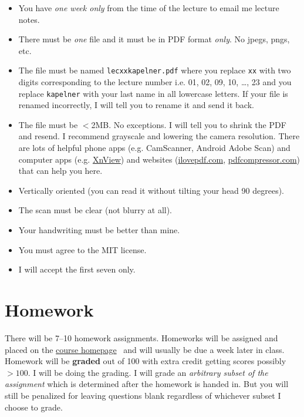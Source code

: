 \documentclass[12pt]{article}
\newcommand{\coursewebpage}{\href{https://github.com/kapelner/QC_Math_621_Fall_2020}{course homepage}}
\newcommand{\pdfcompressiontext}{I recommend  grayscale and lowering the camera resolution. There are lots of helpful phone apps (e.g. CamScanner, Android Adobe Scan) and computer apps (e.g. \href{http://www.xnconvert.com/downloads}{XnView})  and websites (\url{ilovepdf.com}, \url{pdfcompressor.com}) that can help you here.}
\begin{document}
\begin{itemize}
\item You have \emph{one week only} from the time of the lecture to email me lecture notes.
\item There must be \emph{one} file and it must be in PDF format \textit{only}. No jpegs, pngs, etc.
\item The file must be named \texttt{lecxxkapelner.pdf} where you replace \texttt{xx} with two digits corresponding to the lecture number i.e. 01, 02, 09, 10, \ldots, 23 and you replace \texttt{kapelner} with your last name in all lowercase letters. If your file is renamed incorrectly, I will tell you to rename it and send it back.
\item The file must be $<$2MB. No exceptions. I will tell you to shrink the PDF and resend. \pdfcompressiontext
\item Vertically oriented (you can read it without tilting your head 90 degrees).
\item The scan must be clear (not blurry at all).
\item Your handwriting must be better than mine.
\item You must agree to the MIT license.
\item I will accept the first seven only.
\end{itemize}

\section*{Homework}

There will be 7--10 homework assignments. Homeworks will be assigned and placed on the \coursewebpage~ and will usually be due a week later in class. Homework will be \textbf{graded} out of 100 with extra credit getting scores possibly $> 100$. I will be doing the grading. I will grade an \textit{arbitrary subset of the assignment} which is determined after the homework is handed in. But you will still be penalized for leaving questions blank regardless of whichever subset I choose to grade. 

%
\end{document}
